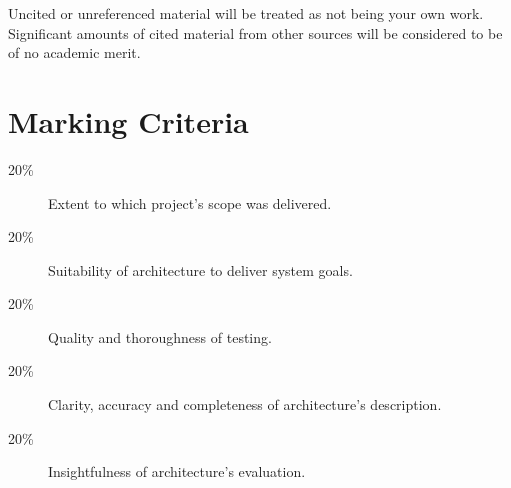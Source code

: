 \documentclass{csse4400}
\begin{document}
Uncited or unreferenced material will be treated as not being your own work.
Significant amounts of cited material from other sources will be considered to be of no academic merit.


\section{Marking Criteria}

\begin{description}
    \item[20\%] Extent to which project's scope was delivered.
    \item[20\%] Suitability of architecture to deliver system goals.
    \item[20\%] Quality and thoroughness of testing.
    \item[20\%] Clarity, accuracy and completeness of architecture's description.
    \item[20\%] Insightfulness of architecture's evaluation.
\end{description}




\end{document}
